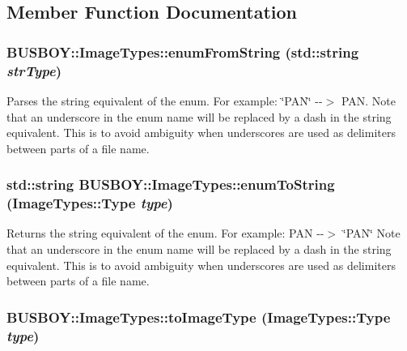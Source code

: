 \subsection{Member Function Documentation}
\hypertarget{classBUSBOY_1_1ImageTypes_aa378a4b1cb7703b83c2c0c7eafbd8344}{
\subsubsection[{enumFromString}]{ BUSBOY::ImageTypes::enumFromString (std::string {\em strType})}}
\label{classBUSBOY_1_1ImageTypes_aa378a4b1cb7703b83c2c0c7eafbd8344}


Parses the string equivalent of the enum. For example: \char`\"{}PAN\char`\"{} -\/-\/$>$ PAN. Note that an underscore in the enum name will be replaced by a dash in the string equivalent. This is to avoid ambiguity when underscores are used as delimiters between parts of a file name. \hypertarget{classBUSBOY_1_1ImageTypes_ab6b89cbc0feb2e25f386660a8aefcbf4}{
\subsubsection[{enumToString}]{\setlength{\rightskip}{0pt plus 5cm}std::string BUSBOY::ImageTypes::enumToString ({\bf ImageTypes::Type} {\em type})}}
\label{classBUSBOY_1_1ImageTypes_ab6b89cbc0feb2e25f386660a8aefcbf4}


Returns the string equivalent of the enum. For example: PAN -\/-\/$>$ \char`\"{}PAN\char`\"{} Note that an underscore in the enum name will be replaced by a dash in the string equivalent. This is to avoid ambiguity when underscores are used as delimiters between parts of a file name. \hypertarget{classBUSBOY_1_1ImageTypes_a20db6862047c3fb93f4da985155ace43}{
\subsubsection[{toImageType}]{ BUSBOY::ImageTypes::toImageType ({\bf ImageTypes::Type} {\em type})}}
\label{classBUSBOY_1_1ImageTypes_a20db6862047c3fb93f4da985155ace43}


